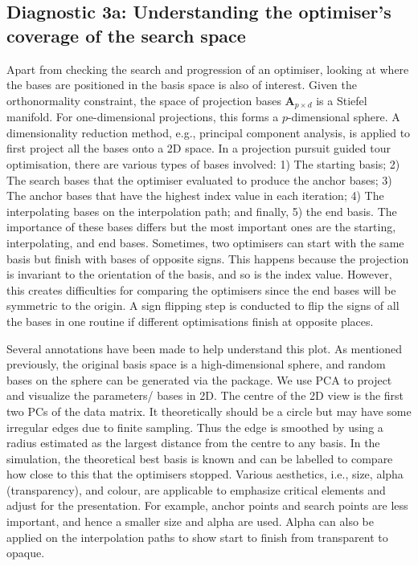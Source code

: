 \hypertarget{toy-pca}{%
\subsection{Diagnostic 3a: Understanding the optimiser's coverage of the
search space}\label{toy-pca}}

Apart from checking the search and progression of an optimiser, looking
at where the bases are positioned in the basis space is also of
interest. Given the orthonormality constraint, the space of projection
bases \(\mathbf{A}_{p \times d}\) is a Stiefel manifold. For
one-dimensional projections, this forms a \(p\)-dimensional sphere. A
dimensionality reduction method, e.g., principal component analysis, is
applied to first project all the bases onto a 2D space. In a projection
pursuit guided tour optimisation, there are various types of bases
involved: 1) The starting basis; 2) The search bases that the optimiser
evaluated to produce the anchor bases; 3) The anchor bases that have the
highest index value in each iteration; 4) The interpolating bases on the
interpolation path; and finally, 5) the end basis. The importance of
these bases differs but the most important ones are the starting,
interpolating, and end bases. Sometimes, two optimisers can start with
the same basis but finish with bases of opposite signs. This happens
because the projection is invariant to the orientation of the basis, and
so is the index value. However, this creates difficulties for comparing
the optimisers since the end bases will be symmetric to the origin. A
sign flipping step is conducted to flip the signs of all the bases in
one routine if different optimisations finish at opposite places.

Several annotations have been made to help understand this plot. As
mentioned previously, the original basis space is a high-dimensional
sphere, and random bases on the sphere can be generated via the
 \citep{geozoo} package. We use PCA to project and
visualize the parameters/ bases in 2D. The centre of the 2D view is the
first two PCs of the data matrix. It theoretically should be a circle
but may have some irregular edges due to finite sampling. Thus the edge
is smoothed by using a radius estimated as the largest distance from the
centre to any basis. In the simulation, the theoretical best basis is
known and can be labelled to compare how close to this that the
optimisers stopped. Various aesthetics, i.e., size, alpha
(transparency), and colour, are applicable to emphasize critical
elements and adjust for the presentation. For example, anchor points and
search points are less important, and hence a smaller size and alpha are
used. Alpha can also be applied on the interpolation paths to show start
to finish from transparent to opaque.

